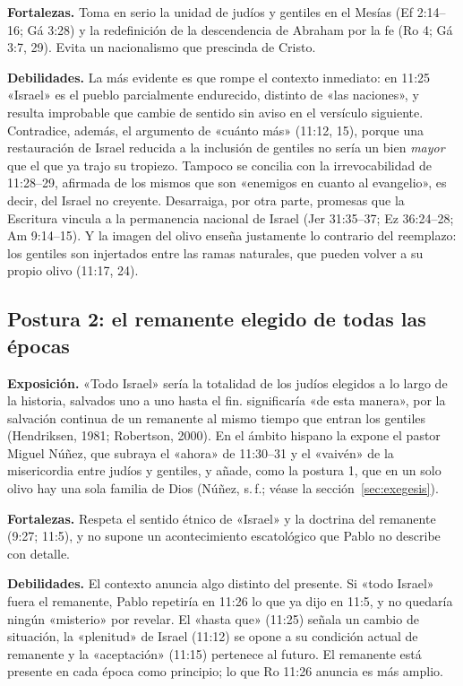 \textbf{Fortalezas.} Toma en serio la unidad de judíos y gentiles en el Mesías (Ef 2:14--16; Gá 3:28) y la redefinición de la descendencia de Abraham por la fe (Ro 4; Gá 3:7, 29). Evita un nacionalismo que prescinda de Cristo.

\textbf{Debilidades.} La más evidente es que rompe el contexto inmediato: en 11:25 «Israel» es el pueblo parcialmente endurecido, distinto de «las naciones», y resulta improbable que cambie de sentido sin aviso en el versículo siguiente. Contradice, además, el argumento de «cuánto más» (11:12, 15), porque una restauración de Israel reducida a la inclusión de gentiles no sería un bien \emph{mayor} que el que ya trajo su tropiezo. Tampoco se concilia con la irrevocabilidad de 11:28--29, afirmada de los mismos que son «enemigos en cuanto al evangelio», es decir, del Israel no creyente. Desarraiga, por otra parte, promesas que la Escritura vincula a la permanencia nacional de Israel (Jer 31:35--37; Ez 36:24--28; Am 9:14--15). Y la imagen del olivo enseña justamente lo contrario del reemplazo: los gentiles son injertados entre las ramas naturales, que pueden volver a su propio olivo (11:17, 24).

\subsection{Postura 2: el remanente elegido de todas las épocas}
\textbf{Exposición.} «Todo Israel» sería la totalidad de los judíos elegidos a lo largo de la historia, salvados uno a uno hasta el fin.  significaría «de esta manera», por la salvación continua de un remanente al mismo tiempo que entran los gentiles (Hendriksen, 1981; Robertson, 2000). En el ámbito hispano la expone el pastor Miguel Núñez, que subraya el «ahora» de 11:30--31 y el «vaivén» de la misericordia entre judíos y gentiles, y añade, como la postura 1, que en un solo olivo hay una sola familia de Dios (Núñez, s.\,f.; véase la sección~\ref{sec:exegesis}).

\textbf{Fortalezas.} Respeta el sentido étnico de «Israel» y la doctrina del remanente (9:27; 11:5), y no supone un acontecimiento escatológico que Pablo no describe con detalle.

\textbf{Debilidades.} El contexto anuncia algo distinto del presente. Si «todo Israel» fuera el remanente, Pablo repetiría en 11:26 lo que ya dijo en 11:5, y no quedaría ningún «misterio» por revelar. El «hasta que» (11:25) señala un cambio de situación, la «plenitud» de Israel (11:12) se opone a su condición actual de remanente y la «aceptación» (11:15) pertenece al futuro. El remanente está presente en cada época como principio; lo que Ro 11:26 anuncia es más amplio.

